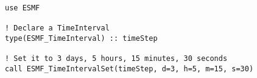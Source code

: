 
\begin{verbatim}
use ESMF

! Declare a TimeInterval
type(ESMF_TimeInterval) :: timeStep

! Set it to 3 days, 5 hours, 15 minutes, 30 seconds
call ESMF_TimeIntervalSet(timeStep, d=3, h=5, m=15, s=30)

\end{verbatim}
